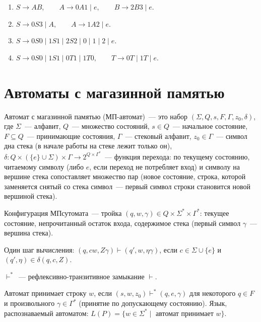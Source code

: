 \documentclass[12pt]{article}
\begin{document}
    \begin{solution}
    	\begin{enumerate}
    		\item $S \rightarrow AB, \qquad A \rightarrow 0A1 \mid e, \qquad B \rightarrow 2B3 \mid e$.
			\item $S \rightarrow 0S3 \mid A, \qquad A \rightarrow 1A2 \mid e$.
			\item $S \rightarrow 0S0 \mid 1S1 \mid 2S2 \mid 0 \mid 1 \mid 2 \mid e$.
			\item $S \rightarrow 0S0 \mid 1S1 \mid 0T1 \mid 1T0, \qquad T \rightarrow 0T \mid 1T \mid e$.
    	\end{enumerate}
    \end{solution}
    
    \section{Автоматы с магазинной памятью}

    \begin{definition}[МП-автомат]
    	Автомат с магазинной памятью (МП-автомат)~--- это набор $(\Sigma, Q, s, F, \Gamma, z_0, \delta)$, где $\Sigma$~--- алфавит, $Q$~--- множество состояний, $s \in Q$~--- начальное состояние, $F \subseteq Q$~--- принимающие состояния, $\Gamma$~--- стековый алфавит, $z_0 \in \Gamma$~--- символ дна стека (в начале работы на стеке лежит только он), $\delta: Q \times (\{e\} \cup \Sigma) \times \Gamma \rightarrow 2^{Q \times \Gamma^*}$~--- функция перехода: по текущему состоянию, читаемому символу (либо $e$, если переход не потребляет вход) и символу на вершине стека сопоставляет множество пар (новое состояние, строка, которой заменяется снятый со стека символ~--- первый символ строки становится новой вершиной стека).
    \end{definition}
    
    \begin{definition}
    	Конфигурация МПсутомата~--- тройка $(q, w, \gamma) \in Q \times \Sigma^* \times \Gamma^*$: текущее состояние, непрочитанный остаток входа, содержимое стека (первый символ $\gamma$~--- вершина стека).
    	
    	Один шаг вычисления: $(q, cw, Z\gamma) \vdash (q', w, \eta\gamma)$, если $c \in \Sigma \cup \{e\}$ и $(q', \eta) \in \delta(q, c, Z)$.
    	
    	$\vdash^*$~--- рефлексивно-транзитивное замыкание $\vdash$.
    	
    	Автомат принимает строку $w$, если $(s, w, z_0) \vdash^* (q, e, \gamma)$ для некоторого $q \in F$ и произвольного $\gamma \in \Gamma^*$ (принятие по допускающему состоянию). Язык, распознаваемый автоматом: $L(P) = \{ w \in \Sigma^* \mid$ автомат принимает $w \}$.
    \end{definition}
    
\end{document}
